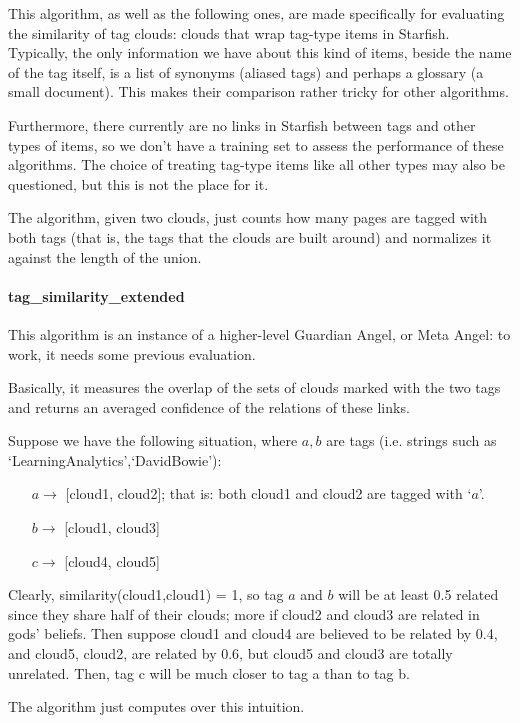 \documentclass[11pt]{article}
\begin{document}
This algorithm, as well as the following ones, are made specifically for evaluating the similarity of tag clouds: clouds that wrap tag-type items in Starfish. Typically, the only information we have about this kind of items, beside the name of the tag itself, is a list of synonyms (aliased tags) and perhaps a glossary (a small document). This makes their comparison rather tricky for other algorithms.

Furthermore, there currently are no links in Starfish between tags and other types of items, so we don't have a training set to assess the performance of these algorithms. The choice of treating tag-type items like all other types may also be questioned, but this is not the place for it.

The algorithm, given two clouds, just counts how many pages are tagged with both tags (that is, the tags that the clouds are built around) and normalizes it against the length of the union.

\paragraph{tag\_similarity\_extended}

This algorithm is an instance of a higher-level Guardian Angel, or Meta Angel: to work, it needs some previous evaluation.

Basically, it measures the overlap of the sets of clouds marked with the two tags and returns an averaged confidence of the relations of these links.

Suppose we have the following situation, where $a,b$ are tags (i.e. strings such as `LearningAnalytics',`DavidBowie'):
\begin{enumerate}			
\item[$a\to$] [cloud1, cloud2]; that is: both cloud1 and cloud2 are tagged with `$a$'.
\item[$b\to$] [cloud1, cloud3]
\item[$c\to$] [cloud4,	cloud5]
\end{enumerate}

Clearly, similarity(cloud1,cloud1) = 1, so tag $a$ and $b$ will be at least 0.5 related since they share half of their clouds; more if cloud2 and cloud3 are related in gods' beliefs.
Then suppose cloud1 and cloud4 are believed to be related by 0.4, and cloud5, cloud2, are related by 0.6, but cloud5 and cloud3 are totally unrelated.
Then, tag c will be much closer to tag a than to tag b.

The algorithm just computes over this intuition.
\end{document}
